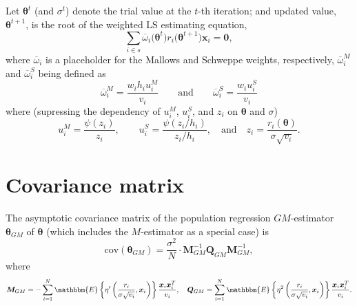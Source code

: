 \documentclass[a4paper,11pt]{scrreprt}
\theoremstyle{remark}
\begin{document}
Let $\bm \theta^{t}$ (and $\sigma^{t}$) denote the trial value at the $t$-th iteration; and updated value, $\bm \theta^{t+1}$, is the root of the weighted LS estimating equation, 
\begin{equation}
   \sum_{i \in s} \overline{\omega}_i \big( \bm \theta^t\big) r_i\big(\bm \theta^{t+1}\big) \bm x_i = \bm 0, 
\end{equation}
\noindent where $\overline{\omega}_i$ is a placeholder for the Mallows and Schweppe weights, respectively, $\overline{\omega}_i^M$ and $\overline{\omega}_i^S$ being defined as  
\begin{equation}
   \overline{\omega}_i^M = \frac{w_i h_i u_i^M}{v_i} \qquad \text{and} \qquad  \overline{\omega}_i^S = \frac{w_i u_i^S}{v_i} 
\end{equation}
\noindent where (supressing the dependency of $u_i^M$, $u_i^S$, and $z_i$ on $\bm \theta$ and $\sigma$) 
\begin{equation}
   u_i^M = \frac{\psi(z_i)}{z_i}, \qquad  u_i^S = \frac{\psi(z_i/h_i)}{z_i/h_i}, \quad \text{and} \quad z_i = \frac{r_i(\bm \theta)}{\sigma \sqrt{v_i}}.
\end{equation}


\section{Covariance matrix}
The asymptotic covariance matrix of the population regression $GM$-estimator $\bm \theta_{GM}$ of $\bm \theta$ (which includes the $M$-estimator as a special case) is 
\begin{equation}\label{eq:cov_pop}
   \mathrm{cov}(\bm \theta_{GM}) = \frac{\sigma^2}{N} \cdot \bm M_{GM}^{-1} \bm Q_{GM} \bm M_{GM}^{-1},
\end{equation}
\noindent where 
\begin{equation*}
   \bm M_{GM} = -\sum_{i=1}^N \mathbbm{E} \left\{\eta' \left( \frac{r_i}{\sigma \sqrt{v_i}}, \bm x_i \right) \right\} \frac{\bm x_i \bm x_i^T}{v_i}, \quad \bm Q_{GM} = \sum_{i = 1}^N \mathbbm{E} \left\{\eta^2 \left( \frac{r_i}{\sigma \sqrt{v_i}}, \bm x_i \right) \right\} \frac{\bm x_i \bm x_i^T}{v_i}.  
\end{equation*}
\end{document}

